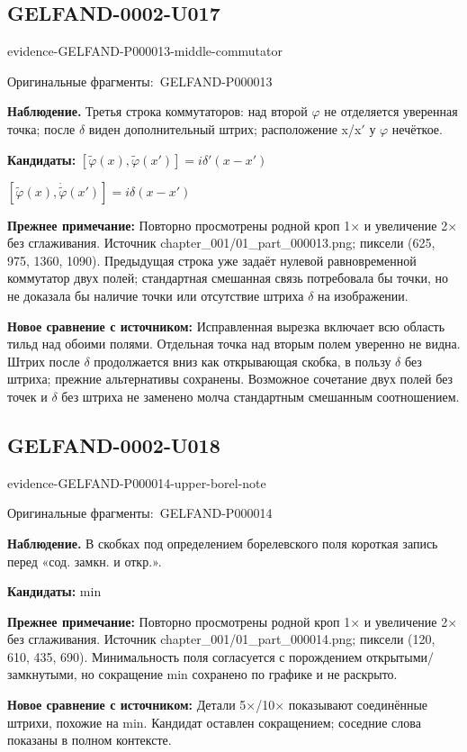 \documentclass[11pt]{article}
\newcommand{\EvidenceBlock}[4]{%
 \par\smallskip\noindent\begin{minipage}{\linewidth}
 \begin{minipage}[t]{.47\linewidth}\vspace{0pt}\centering
 \csname evidence-#1-#2\endcsname\par
 {\scriptsize\SourceCropCaption\ #1}\par
 \end{minipage}\hfill
 \begin{minipage}[t]{.49\linewidth}\vspace{0pt}\raggedright
 {\small\color{orange!65!black}\textbf{#4} #3}\par
 \end{minipage}
 \end{minipage}\par\smallskip}
\newcommand{\SourceCropCaption}{Оригинальные фрагменты:}\newcommand{\ReadingCaption}{Сомнительное чтение.}\newcommand{\IncompleteCaption}{Неразобранный фрагмент.}\newcommand{\DiagramCaption}{Рисунок и набранное описание.}
\begin{document}
\subsection*{GELFAND-0002-U017}
\EvidenceBlock{GELFAND-P000013}{middle-commutator}{Третья строка коммутаторов: над второй \(\varphi\) не отделяется уверенная точка; после \(\delta\) виден дополнительный штрих; расположение x/x\(\prime\) у \(\varphi\) нечёткое.}{Наблюдение.}
\par\smallskip\noindent\textbf{Кандидаты: } \([\widetilde\varphi(x),\widetilde\varphi(x')]=i\delta'(x-x')\)\par\smallskip\([\widetilde\varphi(x),\dot{\widetilde\varphi}(x')]=i\delta(x-x')\)\par
\par\smallskip\noindent\textbf{Прежнее примечание: } Повторно просмотрены родной кроп 1× и увеличение 2× без сглаживания. Источник chapter\_001/01\_part\_000013.png; пиксели (625, 975, 1360, 1090). Предыдущая строка уже задаёт нулевой равновременной коммутатор двух полей; стандартная смешанная связь потребовала бы точки, но не доказала бы наличие точки или отсутствие штриха \(\delta\) на изображении.\par
\par\smallskip\noindent\textbf{Новое сравнение с источником: } Исправленная вырезка включает всю область тильд над обоими полями. Отдельная точка над вторым полем уверенно не видна. Штрих после \(\delta\) продолжается вниз как открывающая скобка, в пользу \(\delta\) без штриха; прежние альтернативы сохранены. Возможное сочетание двух полей без точек и \(\delta\) без штриха не заменено молча стандартным смешанным соотношением.\par

\subsection*{GELFAND-0002-U018}
\EvidenceBlock{GELFAND-P000014}{upper-borel-note}{В скобках под определением борелевского поля короткая запись перед «сод. замкн. и откр.».}{Наблюдение.}
\par\smallskip\noindent\textbf{Кандидаты: } min\par
\par\smallskip\noindent\textbf{Прежнее примечание: } Повторно просмотрены родной кроп 1× и увеличение 2× без сглаживания. Источник chapter\_001/01\_part\_000014.png; пиксели (120, 610, 435, 690). Минимальность поля согласуется с порождением открытыми/замкнутыми, но сокращение min сохранено по графике и не раскрыто.\par
\par\smallskip\noindent\textbf{Новое сравнение с источником: } Детали 5×/10× показывают соединённые штрихи, похожие на min. Кандидат оставлен сокращением; соседние слова показаны в полном контексте.\par
\end{document}
